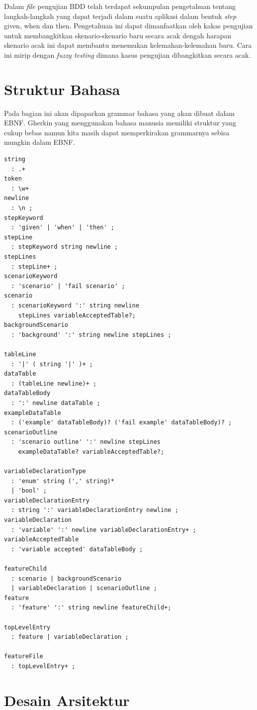 Dalam \emph{file} pengujian BDD telah terdapat sekumpulan pengetahuan tentang langkah-langkah
yang dapat terjadi dalam suatu aplikasi dalam bentuk \emph{step} given, when dan then.
Pengetahuan ini dapat dimanfaatkan oleh kakas pengujian untuk membangkitkan skenario-skenario
baru secara acak dengah harapan skenario acak ini dapat membantu menemukan kelemahan-kelemahan baru.
Cara ini mirip dengan \emph{fuzzy testing} dimana kasus pengujian dibangkitkan secara acak.


\section{Struktur Bahasa}
\label{sec:struktur-bahasa}

Pada bagian ini akan dipaparkan grammar bahasa yang akan dibuat dalam EBNF. Gherkin yang menggunakan bahasa
manusia memiliki struktur yang cukup bebas namun kita masih dapat memperkirakan grammarnya sebisa mungkin
dalam EBNF.

\begin{lstlisting}[language=ebnf]
string
  : .+
token
  : \w+
newline
  : \n ;
stepKeyword
  : 'given' | 'when' | 'then' ;
stepLine
  : stepKeyword string newline ;
stepLines
  : stepLine+ ;
scenarioKeyword
  : 'scenario' | 'fail scenario' ;
scenario
  : scenarioKeyword ':' string newline
    stepLines variableAcceptedTable?;
backgroundScenario
  : 'background' ':' string newline stepLines ;

tableLine
  : '|' ( string '|' )+ ;
dataTable
  : (tableLine newline)+ ;
dataTableBody
  : ':' newline dataTable ;
exampleDataTable
  : ('example' dataTableBody)? ('fail example' dataTableBody)? ;
scenarioOutline
  : 'scenario outline' ':' newline stepLines
    exampleDataTable? variableAcceptedTable?;

variableDeclarationType
  : 'enum' string (',' string)*
  | 'bool' ;
variableDeclarationEntry
  : string ':' variableDeclarationEntry newline ;
variableDeclaration
  : 'variable' ':' newline variableDeclarationEntry+ ;
variableAcceptedTable
  : 'variable accepted' dataTableBody ;

featureChild
  : scenario | backgroundScenario
  | variableDeclaration | scenarioOutline ;
feature
  : 'feature' ':' string newline featureChild+;

topLevelEntry
  : feature | variableDeclaration ;

featureFile
  : topLevelEntry+ ;
\end{lstlisting}


\section{Desain Arsitektur}

